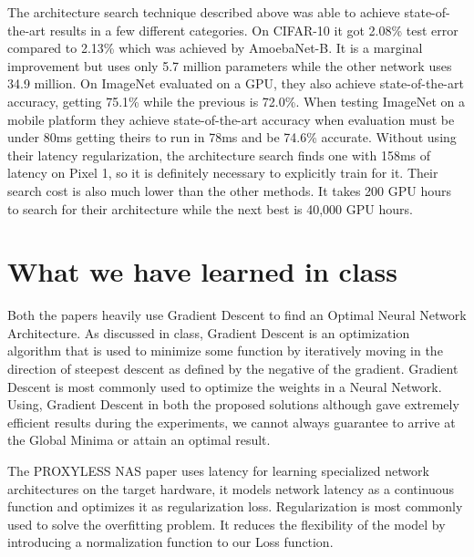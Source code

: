 \documentclass{ieee}
\begin{document}
The architecture search technique described above was able to achieve state-of-the-art results in a few different categories. On CIFAR-10 it got 2.08\% test error compared to 2.13\% which was achieved by AmoebaNet-B. It is a marginal improvement but uses only 5.7 million parameters while the other network uses 34.9 million. On ImageNet evaluated on a GPU, they also achieve state-of-the-art accuracy, getting 75.1\% while the previous is 72.0\%. When testing ImageNet on a mobile platform they achieve state-of-the-art accuracy when evaluation must be under 80ms getting theirs to run in 78ms and be 74.6\% accurate. Without using their latency regularization, the architecture search finds one with 158ms of latency on Pixel 1, so it is definitely necessary to explicitly train for it. Their search cost is also much lower than the other methods. It takes 200 GPU hours to search for their architecture while the next best is 40,000 GPU hours.\\

\section{What we have learned in class}
Both the papers heavily use Gradient Descent to find an Optimal Neural Network Architecture. As discussed in class, Gradient Descent is an optimization algorithm that is used to minimize some function by iteratively moving in the direction of steepest descent as defined by the negative of the gradient. Gradient Descent is most commonly used to optimize the weights in a Neural Network. 
Using, Gradient Descent in both the proposed solutions although gave extremely efficient results during the experiments, we cannot always guarantee to arrive at the Global Minima or attain an optimal result.


The PROXYLESS NAS paper uses latency for learning specialized network architectures on the target hardware, it models network latency as a continuous function and optimizes it as regularization loss. Regularization is most commonly used to solve the overfitting problem. It reduces the flexibility of the model by introducing a normalization function to our Loss function.



 
\end{document}
